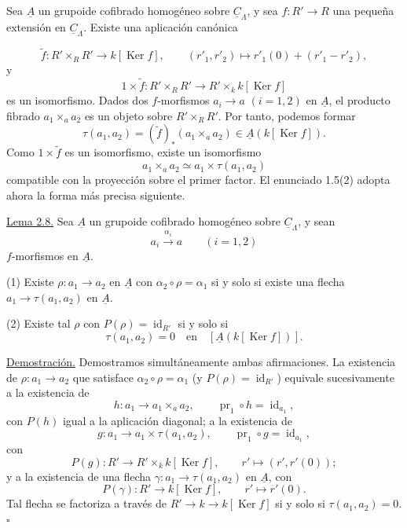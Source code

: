 \par
Sea $\underline A$ un grupoide cofibrado homogéneo sobre
$\underline C_\Lambda$, y sea $f:R'\longrightarrow R$ una pequeña
extensión en $\underline C_\Lambda$. Existe una aplicación canónica


\[
 \widetilde f:R'\times_RR'\longrightarrow k[\operatorname{Ker}f],
 \qquad
 (r'_1,r'_2)\longmapsto r'_1(0)+(r'_1-r'_2),
\]
y
\[
 1\times\widetilde f:R'\times_RR'
 \longrightarrow R'\times_k k[\operatorname{Ker}f]
\]
es un isomorfismo. Dados dos $f$-morfismos
$a_i\longrightarrow a$ $(i=1,2)$ en $\underline A$, el producto
fibrado $a_1\times_a a_2$ es un objeto sobre $R'\times_RR'$. Por
tanto, podemos formar
\[
 \tau(a_1,a_2)=
 (\widetilde f)_*(a_1\times_a a_2)
 \in\underline A(k[\operatorname{Ker}f]).
\]
Como $1\times\widetilde f$ es un isomorfismo, existe un
isomorfismo
\[
 a_1\times_a a_2\simeq a_1\times\tau(a_1,a_2)
\]
compatible con la proyección sobre el primer factor. El enunciado
1.5(2) adopta ahora la forma más precisa siguiente.

\underline{Lema 2.8.} Sea $\underline A$ un grupoide cofibrado
homogéneo sobre $\underline C_\Lambda$, y sean
\[
 a_i\xrightarrow{\ \alpha_i\ }a\qquad(i=1,2)
\]
$f$-morfismos en $\underline A$.

(1) Existe $\rho:a_1\longrightarrow a_2$ en $\underline A$
con $\alpha_2\circ\rho=\alpha_1$ si y solo si existe una flecha
$a_1\longrightarrow\tau(a_1,a_2)$ en $\underline A$.

(2) Existe tal $\rho$ con $P(\rho)=\operatorname{id}_{R'}$
si y solo si
\[
 \tau(a_1,a_2)=0
 \quad\text{en}\quad
 [\underline A(k[\operatorname{Ker}f])].
\]

\underline{Demostración.} Demostramos simultáneamente ambas
afirmaciones. La existencia de $\rho:a_1\longrightarrow a_2$ que
satisface $\alpha_2\circ\rho=\alpha_1$ (y
$P(\rho)=\operatorname{id}_{R'}$) equivale sucesivamente a la
existencia de
\[
 h:a_1\longrightarrow a_1\times_a a_2,
 \qquad \operatorname{pr}_1\circ h=\operatorname{id}_{a_1},
\]
con $P(h)$ igual a la aplicación diagonal; a la existencia de
\[
 g:a_1\longrightarrow a_1\times\tau(a_1,a_2),
 \qquad \operatorname{pr}_1\circ g=\operatorname{id}_{a_1},
\]
con
\[
 P(g):R'\longrightarrow R'\times_k k[\operatorname{Ker}f],
 \qquad r'\longmapsto(r',r'(0));
\]
y a la existencia de una flecha
$\gamma:a_1\longrightarrow\tau(a_1,a_2)$ en $\underline A$, con
\[
 P(\gamma):R'\longrightarrow k[\operatorname{Ker}f],
 \qquad r'\longmapsto r'(0).
\]
Tal flecha se factoriza a través de
$R'\longrightarrow k\longrightarrow k[\operatorname{Ker}f]$ si y
solo si $\tau(a_1,a_2)=0$. \hfill$\square$


